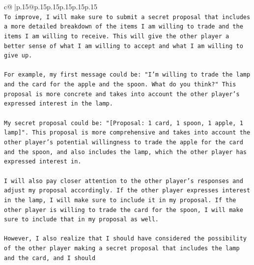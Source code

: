 \documentclass{article}
\begin{document}
{\begin{supertabular}{c@{$\;$}|p{.15\linewidth}@{}p{.15\linewidth}p{.15\linewidth}p{.15\linewidth}p{.15\linewidth}p{.15\linewidth}}
{{{\\ 
\texttt{To improve, I will make sure to submit a secret proposal that includes a more detailed breakdown of the items I am willing to trade and the items I am willing to receive. This will give the other player a better sense of what I am willing to accept and what I am willing to give up.} \\
\\ 
\texttt{For example, my first message could be: "I'm willing to trade the lamp and the card for the apple and the spoon. What do you think?" This proposal is more concrete and takes into account the other player's expressed interest in the lamp.} \\
\\ 
\texttt{My secret proposal could be: "{[}Proposal: 1 card, 1 spoon, 1 apple, 1 lamp{]}". This proposal is more comprehensive and takes into account the other player's potential willingness to trade the apple for the card and the spoon, and also includes the lamp, which the other player has expressed interest in.} \\
\\ 
\texttt{I will also pay closer attention to the other player's responses and adjust my proposal accordingly. If the other player expresses interest in the lamp, I will make sure to include it in my proposal. If the other player is willing to trade the card for the spoon, I will make sure to include that in my proposal as well.} \\
\\ 
\texttt{However, I also realize that I should have considered the possibility of the other player making a secret proposal that includes the lamp and the card, and I should} \\
            }
        }
    }
     \\ \\

\end{supertabular}
}
\end{document}
